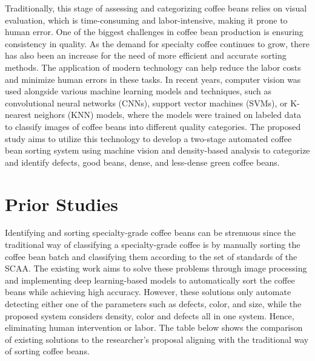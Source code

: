 Traditionally, this stage of assessing and categorizing coffee beans relies on visual evaluation, which is time-consuming and labor-intensive, making it prone to human error. One of the biggest challenges in coffee bean production is ensuring consistency in quality. As the demand for specialty coffee continues to grow, there has also been an increase for the need of more efficient and accurate sorting methods. The application of modern technology can help reduce the labor costs and minimize human errors in these tasks. In recent years, computer vision was used alongside various machine learning models and techniques, such as convolutional neural networks (CNNs), support vector machines (SVMs), or K-nearest neighors (KNN) models, where the models were trained on labeled data to classify images of coffee beans into different quality categories. The proposed study aims to utilize this technology to develop a two-stage automated coffee bean sorting system using machine vision and density-based analysis to categorize and identify defects, good beans, dense, and less-dense green coffee beans. 

\section{Prior Studies}
Identifying and sorting specialty-grade coffee beans can be strenuous since the traditional way of classifying a specialty-grade coffee is by manually sorting the coffee bean batch and classifying them according to the set of standards of the SCAA. The existing work aims to solve these problems through image processing and implementing deep learning-based models to automatically sort the coffee beans while achieving high accuracy. However, these solutions only automate detecting either one of the parameters such as defects, color, and size, while the proposed system considers density, color and defects all in one system. Hence, eliminating human intervention or labor. The table below shows the comparison of existing solutions to the researcher’s proposal aligning with the traditional way of sorting coffee beans.

